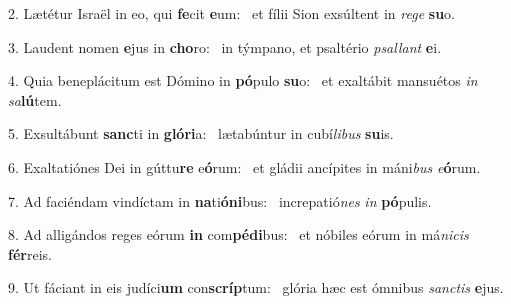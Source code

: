 2. Lætétur Israël in eo, qui \textbf{fe}cit \textbf{e}um: \ast\  et fílii Sion exsúltent in \textit{re}\textit{ge} \textbf{su}o.\

3. Laudent nomen \textbf{e}jus in \textbf{cho}ro: \ast\  in týmpano, et psaltério \textit{psal}\textit{lant} \textbf{e}i.\

4. Quia beneplácitum est Dómino in \textbf{pó}pulo \textbf{su}o: \ast\  et exaltábit mansuétos \textit{in} \textit{sa}\textbf{lú}tem.\

5. Exsultábunt \textbf{sanc}ti in \textbf{gló}\textbf{ri}a: \ast\  lætabúntur in cubí\textit{li}\textit{bus} \textbf{su}is.\

6. Exaltatiónes Dei in gúttu\textbf{re} e\textbf{ó}rum: \ast\  et gládii ancípites in máni\textit{bus} \textit{e}\textbf{ó}rum.\

7. Ad faciéndam vindíctam in \textbf{na}ti\textbf{ó}\textbf{ni}bus: \ast\  increpatió\textit{nes} \textit{in} \textbf{pó}pulis.\

8. Ad alligándos reges eórum \textbf{in} com\textbf{pé}\textbf{di}bus: \ast\  et nóbiles eórum in má\textit{ni}\textit{cis} \textbf{fér}reis.\

9. Ut fáciant in eis judíci\textbf{um} con\textbf{scríp}tum: \ast\  glória hæc est ómnibus \textit{sanc}\textit{tis} \textbf{e}jus.\

